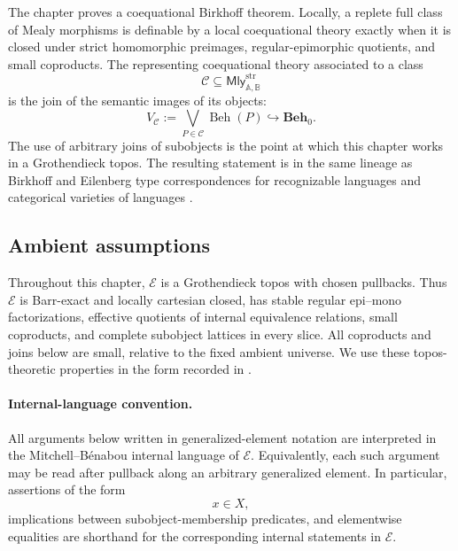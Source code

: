 The chapter proves a coequational Birkhoff theorem. Locally, a replete full
class of Mealy morphisms is definable by a local coequational theory exactly
when it is closed under strict homomorphic preimages, regular-epimorphic
quotients, and small coproducts. The representing coequational theory
associated to a class
\[
    \mathcal C\subseteq\mathsf{Mly}^{\mathrm{str}}_{\mathbb A,\mathbb B}
\]
is the join of the semantic images of its objects:
\[
    V_{\mathcal C}
    :=
    \bigvee_{P\in\mathcal C}\operatorname{Beh}(P)
    \hookrightarrow \mathbf{Beh}_0.
\]
The use of arbitrary joins of subobjects is the point at which this chapter
works in a Grothendieck topos. The resulting statement is in the same lineage
as Birkhoff and Eilenberg type correspondences for recognizable languages and
categorical varieties of languages
\cite{Eilenberg1974,AdamekMiliusMyersUrbat2019TOCL,Salamanca2016Monad,Salamanca2017Unveiling}.

\subsection{Ambient assumptions}
\label{subsec:coeq-birkhoff-ambient-assumptions}

\begin{assumption}
\label{ass:coeq-birkhoff-grothendieck-topos}
    Throughout this chapter, \(\mathcal E\) is a Grothendieck topos with chosen
    pullbacks. Thus \(\mathcal E\) is Barr-exact and locally cartesian closed,
    has stable regular epi--mono factorizations, effective quotients of
    internal equivalence relations, small coproducts, and complete subobject
    lattices in every slice. All coproducts and joins below are small, relative
    to the fixed ambient universe. We use these topos-theoretic properties in
    the form recorded in
    \cite{Johnstone2002,Borceux1994,Jacobs1999CategoricalLogic}.
\end{assumption}

\paragraph{Internal-language convention.}
All arguments below written in generalized-element notation are interpreted
in the Mitchell--Bénabou internal language of \(\mathcal E\). Equivalently,
each such argument may be read after pullback along an arbitrary generalized
element. In particular, assertions of the form
\[
    x\in X,
\]
implications between subobject-membership predicates, and elementwise
equalities are shorthand for the corresponding internal statements in
\(\mathcal E\).

